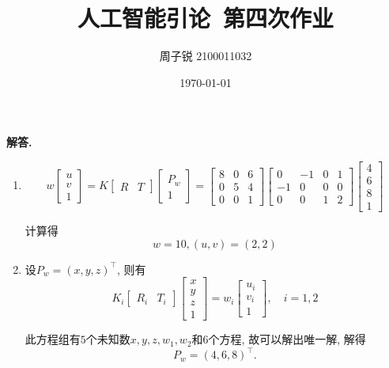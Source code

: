 \documentclass[11pt]{article}
\newenvironment{solution}{\par\noindent\textbf{解答. }}{\par}
\begin{document}
	
	\title{\textbf{人工智能引论\ 第四次作业}}
	\author{周子锐 2100011032}
	\date{\today}
	\maketitle

	\section{}
	\begin{solution}
		\begin{enumerate}[(1)]
			\item $$w\begin{bmatrix}
				u \\ v \\ 1
			\end{bmatrix}=K\begin{bmatrix}
				R & T
			\end{bmatrix}\begin{bmatrix}
				P_w \\ 1
			\end{bmatrix}=\begin{bmatrix}
				8 & 0 & 6 \\ 0 & 5 & 4 \\ 0 & 0 & 1
			\end{bmatrix}\begin{bmatrix}
				0 & -1 & 0 & 1 \\ -1 & 0 & 0 & 0 \\ 0 & 0 & 1 & 2
			\end{bmatrix}\begin{bmatrix}
				4 \\ 6 \\ 8 \\ 1
			\end{bmatrix}$$
	
			计算得$$w=10,(u,v)=(2,2)$$
	
			\item 设$P_w=(x,y,z)^\top$, 则有
			$$K_i\begin{bmatrix}
				R_i & T_i
			\end{bmatrix}\begin{bmatrix}
				x \\ y \\ z \\ 1
			\end{bmatrix}=w_i\begin{bmatrix}
				u_i \\ v_i \\ 1
			\end{bmatrix},\quad i=1,2$$
	
			此方程组有$5$个未知数$x,y,z,w_1,w_2$和$6$个方程, 故可以解出唯一解, 解得 $$P_w=(4,6,8)^\top.$$
		\end{enumerate}
	\end{solution}
	
\end{document}
